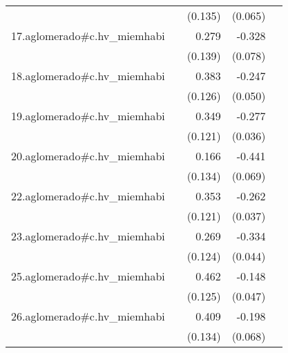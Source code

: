 {\begin{longtable}{l*{4}{D{.}{.}{-1}}}
            &                     &     (0.135)         &     (0.065)         &                     \\
\addlinespace
17.aglomerado#c.hv\_miemhabi&                     &       0.279\sym{*}  &      -0.328\sym{***}&                     \\
            &                     &     (0.139)         &     (0.078)         &                     \\
\addlinespace
18.aglomerado#c.hv\_miemhabi&                     &       0.383\sym{**} &      -0.247\sym{***}&                     \\
            &                     &     (0.126)         &     (0.050)         &                     \\
\addlinespace
19.aglomerado#c.hv\_miemhabi&                     &       0.349\sym{**} &      -0.277\sym{***}&                     \\
            &                     &     (0.121)         &     (0.036)         &                     \\
\addlinespace
20.aglomerado#c.hv\_miemhabi&                     &       0.166         &      -0.441\sym{***}&                     \\
            &                     &     (0.134)         &     (0.069)         &                     \\
\addlinespace
22.aglomerado#c.hv\_miemhabi&                     &       0.353\sym{**} &      -0.262\sym{***}&                     \\
            &                     &     (0.121)         &     (0.037)         &                     \\
\addlinespace
23.aglomerado#c.hv\_miemhabi&                     &       0.269\sym{*}  &      -0.334\sym{***}&                     \\
            &                     &     (0.124)         &     (0.044)         &                     \\
\addlinespace
25.aglomerado#c.hv\_miemhabi&                     &       0.462\sym{***}&      -0.148\sym{**} &                     \\
            &                     &     (0.125)         &     (0.047)         &                     \\
\addlinespace
26.aglomerado#c.hv\_miemhabi&                     &       0.409\sym{**} &      -0.198\sym{**} &                     \\
            &                     &     (0.134)         &     (0.068)         &                     \\

\end{longtable}}
